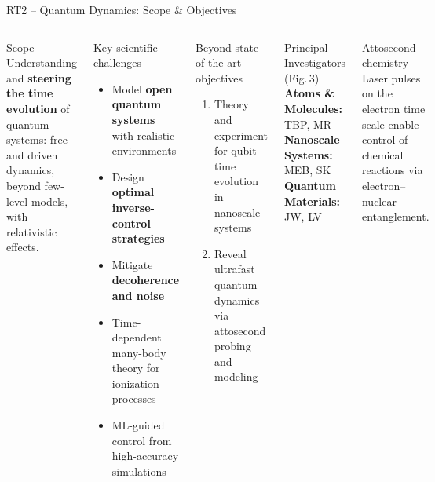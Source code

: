 \documentclass[aspectratio=169,10pt]{beamer}
\begin{document}
\begin{frame}{RT2 -- Quantum Dynamics: Scope \& Objectives}
  \begin{columns}[T]
      \begin{block}{Scope}
        Understanding and \textbf{steering the time evolution}
        of quantum systems: free and driven dynamics,
        beyond few-level models, with relativistic effects.
      \end{block}
      \vspace{2pt}
      \begin{block}{Key scientific challenges}
        \begin{itemize}
          \item Model \textbf{open quantum systems} with realistic environments
          \item Design \textbf{optimal inverse-control strategies}
          \item Mitigate \textbf{decoherence and noise}
          \item Time-dependent many-body theory for ionization processes
          \item ML-guided control from high-accuracy simulations
        \end{itemize}
      \end{block}
      \begin{alertblock}{Beyond-state-of-the-art objectives}
        \begin{enumerate}
          \item Theory and experiment for qubit time evolution
                in nanoscale systems
          \item Reveal ultrafast quantum dynamics via attosecond
                probing and modeling
        \end{enumerate}
      \end{alertblock}
      \vspace{2pt}
      \begin{block}{Principal Investigators (Fig.\,3)}
        \textbf{Atoms \& Molecules:} TBP, MR\\[2pt]
        \textbf{Nanoscale Systems:} MEB, SK\\[2pt]
        \textbf{Quantum Materials:} JW, LV
      \end{block}
      \vspace{2pt}
      \begin{block}{Attosecond chemistry}
        Laser pulses on the electron time scale enable control
        of chemical reactions via electron--nuclear entanglement.
      \end{block}
  \end{columns}
\end{frame}
\end{document}
